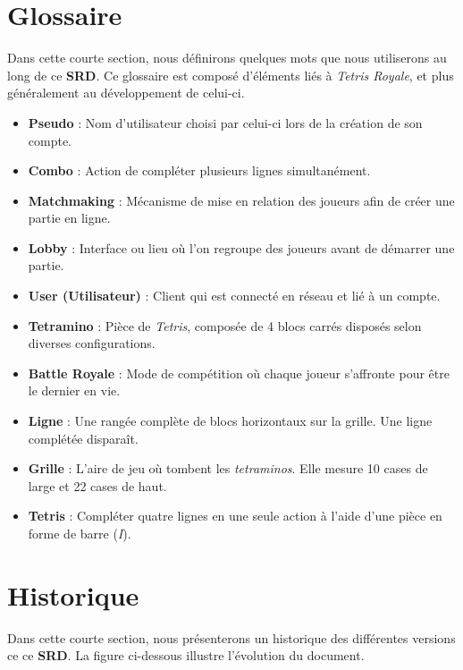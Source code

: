 \documentclass{report}
\begin{document}
\section{Glossaire}

\noindent Dans cette courte section, nous définirons quelques mots que nous utiliserons au long de ce \textbf{SRD}. Ce glossaire est composé d'éléments liés à \textit{Tetris Royale}, et plus généralement au développement de celui-ci.

\begin{itemize}
    \item\textbf{Pseudo} : Nom d’utilisateur choisi par celui-ci lors de la création de son compte.
    \item\textbf{Combo} : Action de compléter plusieurs lignes simultanément.
    \item\textbf{Matchmaking} : Mécanisme de mise en relation des joueurs afin de créer une partie en ligne.
    \item\textbf{Lobby} : Interface ou lieu où l'on regroupe des joueurs avant de démarrer une partie.
    \item\textbf{User (Utilisateur)} : Client qui est connecté en réseau et lié à un compte.
    \item\textbf{Tetramino} : Pièce de \emph{Tetris}, composée de 4 blocs carrés disposés selon diverses configurations.
    \item\textbf{Battle Royale} : Mode de compétition où chaque joueur s'affronte pour être le dernier en vie.
    \item\textbf{Ligne} : Une rangée complète de blocs horizontaux sur la grille. Une ligne complétée disparaît.
    \item\textbf{Grille} : L'aire de jeu où tombent les \emph{tetraminos}. Elle mesure 10 cases de large et 22 cases de haut.
    \item\textbf{Tetris} : Compléter quatre lignes en une seule action à l’aide d’une pièce en forme de barre (\emph{I}).
\end{itemize}



\section{Historique}

\noindent Dans cette courte section, nous présenterons un historique des différentes versions ce ce \textbf{SRD}. La figure ci-dessous illustre l'évolution du document.
\end{document}
